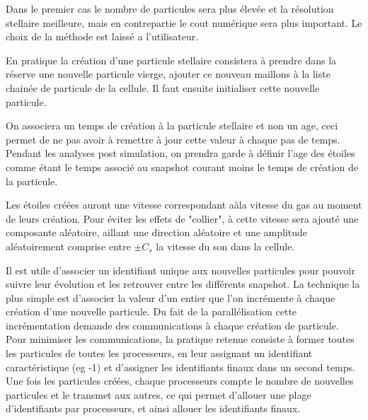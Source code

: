 Dans le premier cas le nombre de particules sera plus élevée et la résolution stellaire meilleure, mais en contrepartie le cout numérique sera plus important.
Le choix de la méthode est laissé a l'utilisateur.


En pratique la création d'une particule stellaire consistera à prendre dans la réserve une nouvelle particule vierge, ajouter ce nouveau maillons à la liste chainée de particule de la cellule.
Il faut ensuite initialiser cette nouvelle particule.

On associera un temps de création à la particule stellaire et non un age, ceci permet de ne pas avoir à remettre à jour cette valeur à chaque pas de temps.
Pendant les analyses post simulation, on prendra garde à définir l'age des étoiles comme étant le temps associé au snapshot courant moins le temps de création de la particule.

Les étoiles créées auront une vitesse correspondant aàla vitesse du gas au moment de leurs création.
Pour éviter les effets de "collier", à cette vitesse sera ajouté une composante aléatoire, aillant une direction aléatoire et une amplitude aléatoirement comprise entre $\pm C_s$ la vitesse du son dans la cellule.

Il est utile d'associer un identifiant unique aux nouvelles particules pour pouvoir suivre leur évolution et les retrouver entre les différents snapshot.
La technique la plus simple est d'associer la valeur d'un entier que l'on incrémente à chaque création d'une nouvelle particule.
Du fait de la parallélisation cette incrémentation demande des communications à chaque création de particule.
Pour minimiser les communications, la pratique retenue consiste à former toutes les particules de toutes les processeurs, en leur assignant un identifiant caractéristique (eg -1) et d'assigner les identifiants finaux dans un second temps.
Une fois les particules créées, chaque processeurs compte le nombre de nouvelles particules et le transmet aux autres, ce qui permet d'allouer une plage d'identifiants par processeurs, et ainsi allouer les identifiants finaux.

